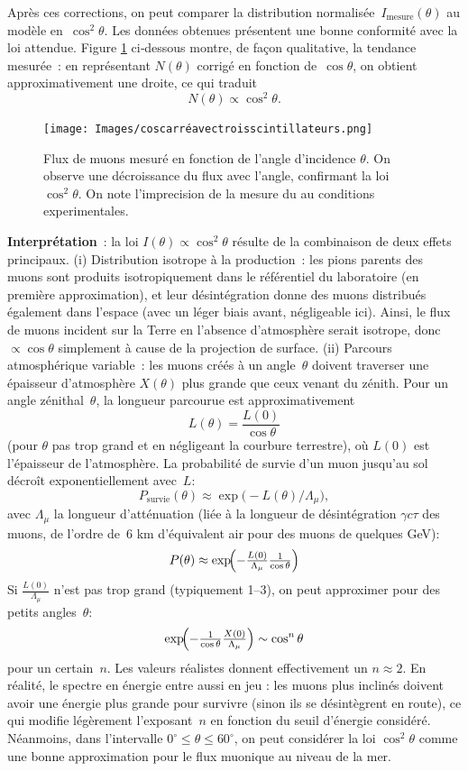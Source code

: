 \documentclass[a4paper,12pt,twoside]{article}
\begin{document}
Après ces corrections, on peut comparer la distribution normalisée~$I_{\mathrm{mesure}}(\theta)$ au modèle en~$\cos^{2}\theta$. Les données obtenues présentent une bonne conformité avec la loi attendue. 
Figure \ref{fig:cos2s} ci‑dessous montre, de façon qualitative, la tendance mesurée~: en représentant $N(\theta)$ corrigé en fonction de~$\cos\theta$, on obtient approximativement une droite, ce qui traduit
\[
N(\theta)\propto\cos^{2}\theta.
\]
\begin{figure}[!h]
  \centering
  \texttt{[image: Images/coscarréavectroisscintillateurs.png]}
  \caption{Flux de muons mesuré en fonction de l'angle d'incidence $\theta$. On observe une décroissance du flux avec l'angle, confirmant la loi $\cos^2\theta$. On note l'imprecision de la mesure du au conditions experimentales.}
  \label{fig:cos2s}
\end{figure}

\textbf{Interprétation}~: la loi $I(\theta)\propto\cos^2\theta$ résulte de la combinaison de deux effets principaux.  
(i) Distribution isotrope à la production~: les pions parents des muons sont produits isotropiquement dans le référentiel du laboratoire (en première approximation), et leur désintégration donne des muons distribués également dans l'espace (avec un léger biais avant, négligeable ici).
Ainsi, le flux de muons incident sur la Terre en l'absence d'atmosphère serait isotrope, donc $\propto\cos\theta$ simplement à cause de la projection de surface.  
(ii) Parcours atmosphérique variable~: les muons créés à un angle~$\theta$ doivent traverser une épaisseur d'atmosphère $X(\theta)$ plus grande que ceux venant du zénith. Pour un angle zénithal~$\theta$, la longueur parcourue est approximativement
\[
L(\theta)=\frac{L(0)}{\cos\theta}
\]
(pour $\theta$ pas trop grand et en négligeant la courbure terrestre), où $L(0)$ est l'épaisseur de l'atmosphère. La probabilité de survie d'un muon jusqu'au sol décroît exponentiellement avec~$L$:
\[
P_{\mathrm{survie}}(\theta)\approx\exp\bigl(-L(\theta)/\Lambda_{\mu}\bigr),
\]
avec $\Lambda_{\mu}$ la longueur d'atténuation (liée à la longueur de désintégration $\gamma c\tau$ des muons, de l'ordre de~6 km d'équivalent air pour des muons de quelques GeV):
\[
P(\theta)\approx \exp\!\Bigl(-\tfrac{L(0)}{\Lambda_\mu}\tfrac1{\cos\theta}\Bigr)
\]
Si $\tfrac{L(0)}{\Lambda_\mu}$ n'est pas trop grand (typiquement 1--3), on peut approximer pour des petits angles~$\theta$:
\[
\exp\!\Bigl(-\tfrac1{\cos\theta}\tfrac{X(0)}{\Lambda_\mu}\Bigr)\sim\cos^n\theta
\]
pour un certain~$n$. Les valeurs réalistes donnent effectivement un $n\approx2$. En réalité, le spectre en énergie entre aussi en jeu : les muons plus inclinés doivent avoir une énergie plus grande pour survivre (sinon ils se désintègrent en route), ce qui modifie légèrement l'exposant~$n$ en fonction du seuil d'énergie considéré. Néanmoins, dans l'intervalle $0^\circ \le \theta \leq 60^\circ$, on peut consid\'erer la loi $\cos^2\theta$ comme une bonne approximation pour le flux muonique au niveau de la mer.
\end{document}
